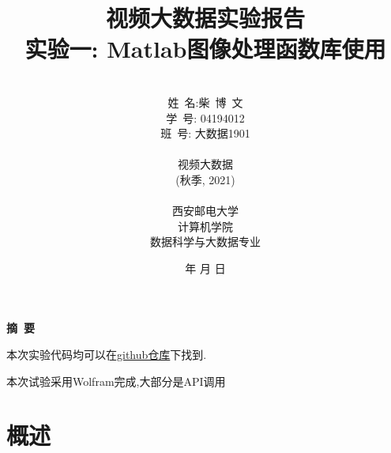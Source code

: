 \documentclass[a4paper]{article}
\begin{document}
\renewcommand{\contentsname}{目\ 录}
\renewcommand{\appendixname}{附录}
\renewcommand{\appendixpagename}{附录}
\renewcommand{\refname}{参考文献} 
\renewcommand{\figurename}{图}
\renewcommand{\tablename}{表}
\renewcommand{\today}{\number\year 年 \number\month 月 \number\day 日}

\title{{\Huge 视频大数据实验报告{\large\linebreak\\}}{\Large 实验一: Matlab图像处理函数库使用\linebreak\linebreak}}
\author{\\姓\ 名:柴\ 博\ 文\\ 
学\ 号: 04194012\\
班\ 号: 大数据1901\\\\
视频大数据\\
(秋季, 2021)\\\\
西安邮电大学\\
计算机学院\\
数据科学与大数据专业}
\date{\today}
\maketitle
\newpage

\begin{center}
{\Large\bf{摘\ 要\\}}
\end{center}

本次实验代码均可以在\href{https://github.com/lovebaihezi/lab/tree/main/IV-process/视频大数据实验3.ipynb}{github仓库}下找到.

本次试验采用Wolfram完成,大部分是API调用

\newpage
\begin{center}
\tableofcontents\label{c}
\end{center}
\newpage



\section{概述} \label{overview}%
\end{document}
